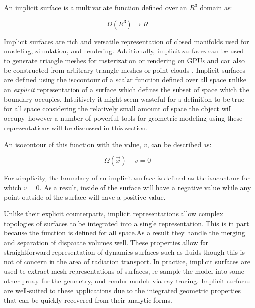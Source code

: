 An implicit surface is a multivariate function defined over an $ R^3 $ domain as:

\begin{equation}
    \Omega(R^3)\rightarrow R
\end{equation}

Implicit surfaces are rich and versatile representation of closed manifolds used
for modeling, simulation, and rendering. Additionally, implicit surfaces can be
used to generate triangle meshes for rasterization or rendering on GPUs
\cite{Sethian_1996} and can also be constructed from arbitrary triangle meshes
or point clouds \cite{Sigg_2006}. Implicit surfaces are defined using the
isocontour of a scalar function defined over all space unlike an
\textit{explicit} representation of a surface which defines the subset of space
which the boundary occupies. Intuitively it might seem wasteful for a definition
to be true for all space considering the relatively small amount of space the
object will occupy, however a number of powerful tools for geometric modeling
using these representations will be discussed in this section.

An isocontour of this function with the value, $v$, can be described as:

\begin{equation}
  \Omega(\vec{x}) - v  = 0 
\end{equation}

For simplicity, the boundary of an implicit surface is defined as the isocontour
for which $v=0$. As a result, inside of the surface will have a negative value
while any point outside of the surface will have a positive value.

Unlike their explicit counterparts, implicit representations allow complex
topologies of surfaces to be integrated into a single representation. This is in
part because the function is defined for all space.As a result they handle the
merging and separation of disparate volumes well. These properties allow for
straightforward representation of dynamics surfaces such as fluids though this
is not of concern in the area of radiation transport. In practice, implicit
surfaces are used to extract mesh representations of surfaces, re-sample the
model into some other proxy for the geometry, and render models via ray
tracing. Implicit surfaces are well-suited to these applications due to the
integrated geometric properties that can be quickly recovered from their
analytic forms.

